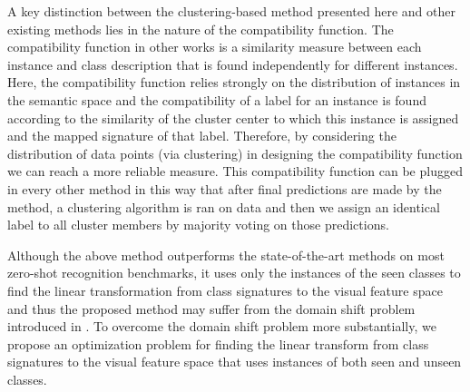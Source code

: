 \documentclass[letterpaper]{article}
\begin{document}


A key distinction between the clustering-based method presented here and other existing methods lies in the nature of the compatibility function.
 The compatibility function in other works is a similarity measure between each instance and class description that is found independently for different instances.
 Here, the compatibility function relies strongly on the distribution of instances in the semantic space and the compatibility of a label for an instance is found
according to the similarity of the cluster center to which this instance is assigned and the mapped signature of that label.
Therefore, by considering the distribution of data points (via clustering)
in designing the compatibility function we can reach a more reliable measure.
This compatibility function can be plugged in every other method in this way that after final predictions are made by the method,
a clustering algorithm is ran on data and then we assign an identical label to all cluster
members by majority voting on those predictions.

Although the above method outperforms the state-of-the-art methods on most zero-shot recognition benchmarks, it uses only the instances of the seen classes to find the linear transformation from class signatures to the visual feature space and thus the proposed method may suffer from the domain shift problem introduced in \cite{eccv14}.
To overcome the domain shift problem more substantially, we propose an optimization problem for finding the linear transform from class signatures to the visual feature space that uses instances of both seen and unseen classes.
\end{document}
